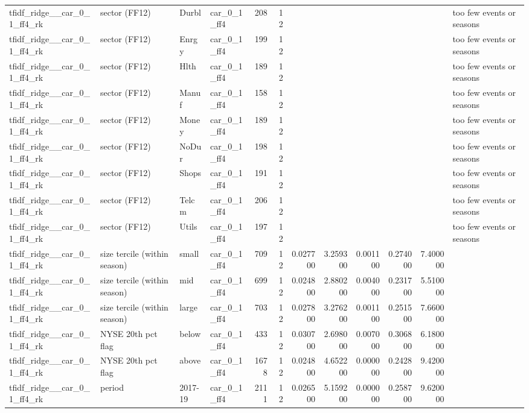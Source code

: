 \begin{table}
\begin{tabular}{llllrrrrrrrl}
tfidf\_ridge\_\_car\_0\_1\_ff4\_rk & sector (FF12) & Durbl & car\_0\_1\_ff4 & 208 & 12 &  &  &  &  &  & too few events or seasons \\
tfidf\_ridge\_\_car\_0\_1\_ff4\_rk & sector (FF12) & Enrgy & car\_0\_1\_ff4 & 199 & 12 &  &  &  &  &  & too few events or seasons \\
tfidf\_ridge\_\_car\_0\_1\_ff4\_rk & sector (FF12) & Hlth & car\_0\_1\_ff4 & 189 & 12 &  &  &  &  &  & too few events or seasons \\
tfidf\_ridge\_\_car\_0\_1\_ff4\_rk & sector (FF12) & Manuf & car\_0\_1\_ff4 & 158 & 12 &  &  &  &  &  & too few events or seasons \\
tfidf\_ridge\_\_car\_0\_1\_ff4\_rk & sector (FF12) & Money & car\_0\_1\_ff4 & 189 & 12 &  &  &  &  &  & too few events or seasons \\
tfidf\_ridge\_\_car\_0\_1\_ff4\_rk & sector (FF12) & NoDur & car\_0\_1\_ff4 & 198 & 12 &  &  &  &  &  & too few events or seasons \\
tfidf\_ridge\_\_car\_0\_1\_ff4\_rk & sector (FF12) & Shops & car\_0\_1\_ff4 & 191 & 12 &  &  &  &  &  & too few events or seasons \\
tfidf\_ridge\_\_car\_0\_1\_ff4\_rk & sector (FF12) & Telcm & car\_0\_1\_ff4 & 206 & 12 &  &  &  &  &  & too few events or seasons \\
tfidf\_ridge\_\_car\_0\_1\_ff4\_rk & sector (FF12) & Utils & car\_0\_1\_ff4 & 197 & 12 &  &  &  &  &  & too few events or seasons \\
tfidf\_ridge\_\_car\_0\_1\_ff4\_rk & size tercile (within season) & small & car\_0\_1\_ff4 & 709 & 12 & 0.027700 & 3.259300 & 0.001100 & 0.274000 & 7.400000 &  \\
tfidf\_ridge\_\_car\_0\_1\_ff4\_rk & size tercile (within season) & mid & car\_0\_1\_ff4 & 699 & 12 & 0.024800 & 2.880200 & 0.004000 & 0.231700 & 5.510000 &  \\
tfidf\_ridge\_\_car\_0\_1\_ff4\_rk & size tercile (within season) & large & car\_0\_1\_ff4 & 703 & 12 & 0.027800 & 3.276200 & 0.001100 & 0.251500 & 7.660000 &  \\
tfidf\_ridge\_\_car\_0\_1\_ff4\_rk & NYSE 20th pct flag & below & car\_0\_1\_ff4 & 433 & 12 & 0.030700 & 2.698000 & 0.007000 & 0.306800 & 6.180000 &  \\
tfidf\_ridge\_\_car\_0\_1\_ff4\_rk & NYSE 20th pct flag & above & car\_0\_1\_ff4 & 1678 & 12 & 0.024800 & 4.652200 & 0.000000 & 0.242800 & 9.420000 &  \\
tfidf\_ridge\_\_car\_0\_1\_ff4\_rk & period & 2017-19 & car\_0\_1\_ff4 & 2111 & 12 & 0.026500 & 5.159200 & 0.000000 & 0.258700 & 9.620000 &  \\

\end{tabular}
\end{table}
